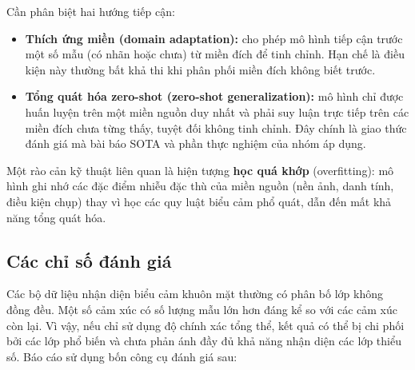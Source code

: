 Cần phân biệt hai hướng tiếp cận:
\begin{itemize}
    \item \textbf{Thích ứng miền (domain adaptation):} cho phép mô hình tiếp cận trước một số mẫu (có nhãn hoặc chưa) từ miền đích để tinh chỉnh. Hạn chế là điều kiện này thường bất khả thi khi phân phối miền đích không biết trước.
    \item \textbf{Tổng quát hóa zero-shot (zero-shot generalization):} mô hình chỉ được huấn luyện trên một miền nguồn duy nhất và phải suy luận trực tiếp trên các miền đích chưa từng thấy, tuyệt đối không tinh chỉnh. Đây chính là giao thức đánh giá mà bài báo SOTA và phần thực nghiệm của nhóm áp dụng.
\end{itemize}
Một rào cản kỹ thuật liên quan là hiện tượng \textbf{học quá khớp} (overfitting): mô hình ghi nhớ các đặc điểm nhiễu đặc thù của miền nguồn (nền ảnh, danh tính, điều kiện chụp) thay vì học các quy luật biểu cảm phổ quát, dẫn đến mất khả năng tổng quát hóa.

\subsection{Các chỉ số đánh giá}

Các bộ dữ liệu nhận diện biểu cảm khuôn mặt thường có phân bố lớp không đồng đều. Một số cảm xúc có số lượng mẫu lớn hơn đáng kể so với các cảm xúc còn lại. Vì vậy, nếu chỉ sử dụng độ chính xác tổng thể, kết quả có thể bị chi phối bởi các lớp phổ biến và chưa phản ánh đầy đủ khả năng nhận diện các lớp thiểu số. Báo cáo sử dụng bốn công cụ đánh giá sau:


